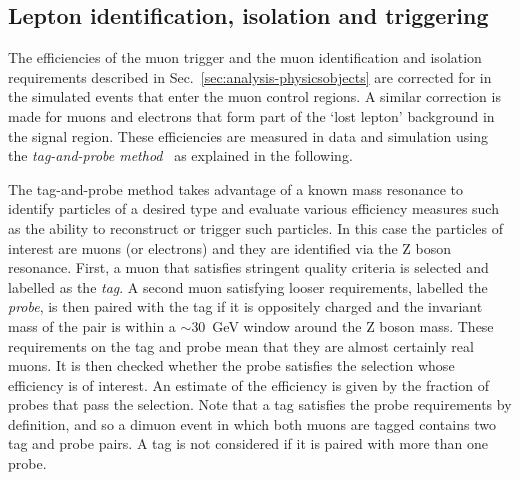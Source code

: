 

\subsection{Lepton identification, isolation and triggering}
\label{sec:analysis-mccorrections-muonsf}
The efficiencies of the muon trigger and the muon identification and isolation 
requirements 
described in Sec.~\ref{sec:analysis-physicsobjects} are corrected for in 
the simulated events that enter the muon control regions. A similar correction 
is made for muons and electrons that form part of the `lost lepton' background 
in the signal region. These efficiencies 
are measured in data and simulation using the \textit{tag-and-probe 
method}~\cite{tagnprobe} as explained in the following.

The tag-and-probe method takes advantage of a known mass resonance to identify 
particles of a desired type and evaluate various efficiency measures such as 
the ability to reconstruct or trigger such particles. In this case the 
particles of interest are muons (or electrons) and they are identified via the 
Z boson resonance. 
First, a muon that satisfies stringent quality criteria is selected and 
labelled as the \textit{tag}. A second muon satisfying looser requirements, 
labelled the \textit{probe}, is then paired with the tag if it is oppositely 
charged and the invariant mass of the pair is within a $\sim$30~GeV window 
around the Z boson mass. These requirements on the tag and probe mean that they 
are almost certainly real muons. It is then checked whether the probe satisfies 
the selection whose efficiency is of interest. An estimate of the efficiency is 
given by the fraction of probes that pass the selection. Note that a tag 
satisfies the probe requirements by definition, and so a dimuon event in which 
both muons are tagged contains two tag and probe pairs. A tag is not considered 
if it is paired with more than one probe.

